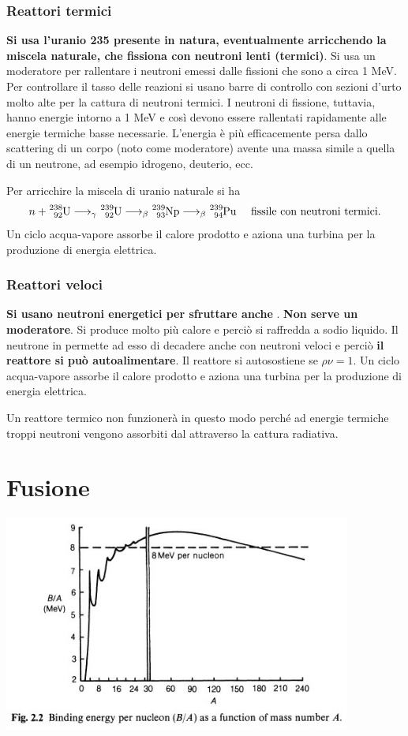 \documentclass[a4paper,11pt,twoside,openany]{book}
\theoremstyle{definition}
\theoremstyle{plain}
\theoremstyle{plain}
\theoremstyle{definition}
\begin{document}
\subsection{Reattori termici} %
\textbf{Si usa l'uranio 235 presente in natura, eventualmente arricchendo la miscela naturale, che fissiona con neutroni lenti (termici)}. Si usa un moderatore per rallentare i neutroni emessi dalle fissioni che sono a circa 1 MeV. Per controllare il tasso delle reazioni si usano barre di controllo con sezioni d'urto molto alte per la cattura di neutroni termici. I neutroni di fissione, tuttavia, hanno energie intorno a 1 MeV e così devono essere rallentati rapidamente alle energie termiche basse necessarie. L'energia è più efficacemente persa dallo scattering di un corpo (noto come moderatore) avente una massa simile a quella di un neutrone, ad esempio idrogeno, deuterio, ecc.

Per arricchire la miscela di uranio naturale si ha $$n+\ce{^{238}_{92}U}\longrightarrow_{\gamma} \ce{^{239}_{92}U}\longrightarrow_{\beta} \ce{^{239}_{93}Np}\longrightarrow_{\beta} \ce{^{239}_{94}Pu} \quad \textrm{ fissile con neutroni termici}.$$ Un ciclo acqua-vapore assorbe il calore prodotto e aziona una turbina per la produzione di energia elettrica.

\subsection{Reattori veloci} %
\textbf{Si usano neutroni energetici per sfruttare anche }. \textbf{Non serve un moderatore}. Si produce molto più calore e perciò si raffredda a sodio liquido. Il neutrone in  permette ad esso di decadere anche con neutroni veloci e perciò \textbf{il reattore si può autoalimentare}. Il reattore si autosostiene se $\rho\nu=1$. Un ciclo acqua-vapore assorbe il calore prodotto e aziona una turbina per la produzione di energia elettrica.

Un reattore termico non funzionerà in questo modo perché ad energie termiche troppi neutroni vengono assorbiti dal  attraverso la cattura radiativa.

\chapter{Fusione} %
\begin{center}
\includegraphics[width=4.5in]{immagini/bound_energy.jpg} %
\end{center}
\end{document}
